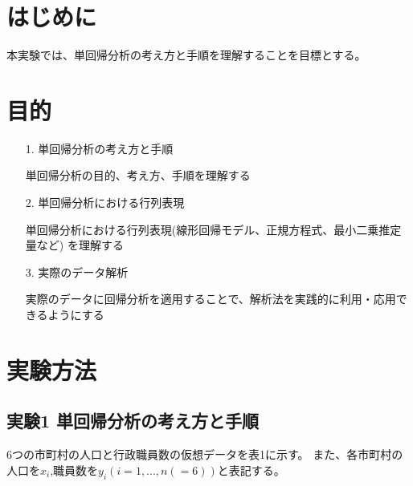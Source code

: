 \documentclass[12pt]{jarticle}
\begin{document}



\section{はじめに}
本実験では、単回帰分析の考え方と手順を理解することを目標とする。

\section{目的}
\begin{itemize}
    \item [1.]単回帰分析の考え方と手順

          単回帰分析の目的、考え方、手順を理解する
    \item [2.]単回帰分析における行列表現

          単回帰分析における行列表現(線形回帰モデル、正規方程式、最小二乗推定量など)
          を理解する
    \item [3.]実際のデータ解析

          実際のデータに回帰分析を適用することで、解析法を実践的に利用・応用できるようにする
\end{itemize}

\section{実験方法}
\subsection{実験1 単回帰分析の考え方と手順}
6つの市町村の人口と行政職員数の仮想データを表1に示す。
また、各市町村の人口を$x_i$,職員数を$y_i(i=1,...,n(=6))$と表記する。
\end{document}
